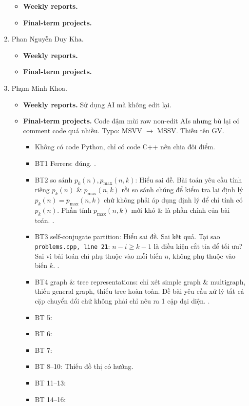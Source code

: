 \documentclass{article}
\begin{document}
\begin{enumerate}
    \begin{itemize}
        \item {\bf Weekly reports.}
        \item {\bf Final-term projects.}
    \end{itemize}
    \item {\sc Phan Nguyễn Duy Kha.}
    \begin{itemize}
        \item {\bf Weekly reports.}
        \item {\bf Final-term projects.}
    \end{itemize}
    \item {\sc Phạm Minh Khoa.}
    \begin{itemize}
        \item {\bf Weekly reports.} Sử dụng AI mà không  edit lại.
        \item {\bf Final-term projects.} Code đậm mùi raw non-edit AIs nhưng bù lại có comment code quá nhiều. Typo: MSVV $\to$ MSSV. Thiếu tên GV.
        \begin{itemize}
            \item Không có code Python, chỉ có code C++ nên chia đôi điểm.
            \item BT1 Ferrers: đúng. .
            \item BT2 so sánh $p_k(n),p_{\max}(n,k)$: Hiểu sai đề. Bài toán yêu cầu tính riêng $p_k(n)$ \& $p_{\max}(n,k)$ rồi so sánh chúng để kiểm tra lại định lý $p_k(n) = p_{\max}(n,k)$ chứ không phải áp dụng định lý để chỉ tính có $p_k(n)$. Phần tính $p_{\max}(n,k)$ mới khó \& là phần chính  của bài toán. .
            \item BT3 self-conjugate partition: Hiểu sai đề. Sai kết quả. Tại sao {\tt problems.cpp, line 21}: $n - i\ge k - 1$ là điều kiện cắt tỉa để tối ưu? Sai vì bài toán chỉ phụ thuộc vào mỗi biến $n$, không phụ thuộc vào biến $k$. .
            \item BT4 graph \& tree representations: chỉ xét simple graph \& multigraph, thiếu general graph, thiếu tree hoàn toàn. Đề bài yêu cầu xử lý tất cả cặp chuyển đổi chứ không phải chỉ nêu ra 1 cặp đại diện. .
            \item BT 5:
            \item BT 6:
            \item BT 7:
            \item BT 8--10: Thiếu đồ thị có hướng.
            \item BT 11--13:
            \item BT 14--16:

\end{itemize}
\end{itemize}
\end{enumerate}
\end{document}
